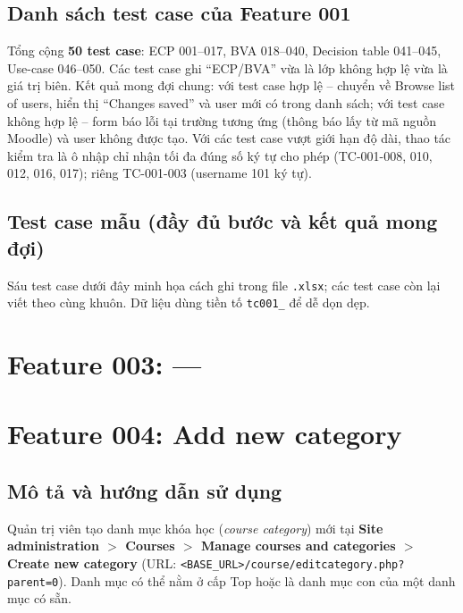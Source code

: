 \documentclass[12pt,a4paper]{article}
\begin{document}
\subsection{Danh sách test case của Feature 001}
Tổng cộng \textbf{50 test case}: ECP 001--017, BVA 018--040, Decision table 041--045, Use-case 046--050.
Các test case ghi ``ECP/BVA'' vừa là lớp không hợp lệ vừa là giá trị biên.
Kết quả mong đợi chung: với test case hợp lệ -- chuyển về Browse list of users, hiển thị ``Changes saved'' và user mới có trong danh sách;
với test case không hợp lệ -- form báo lỗi tại trường tương ứng (thông báo lấy từ mã nguồn Moodle) và user không được tạo.
Với các test case vượt giới hạn độ dài, thao tác kiểm tra là ô nhập chỉ nhận tối đa đúng số ký tự cho phép
(TC-001-008, 010, 012, 016, 017); riêng TC-001-003 (username 101 ký tự).



\subsection{Test case mẫu (đầy đủ bước và kết quả mong đợi)}
Sáu test case dưới đây minh họa cách ghi trong file \texttt{.xlsx}; các test case còn lại viết theo cùng khuôn.
Dữ liệu dùng tiền tố \texttt{tc001\_} để dễ dọn dẹp.




\section{Feature 003: ---}
\section{Feature 004: Add new category}

\subsection{Mô tả và hướng dẫn sử dụng}
Quản trị viên tạo danh mục khóa học (\textit{course category}) mới tại \textbf{Site administration $>$ Courses $>$ Manage courses and categories $>$ Create new category}
(URL: \texttt{<BASE\_URL>/course/editcategory.php?parent=0}). Danh mục có thể nằm ở cấp Top hoặc là danh mục con của một danh mục có sẵn.
\end{document}
